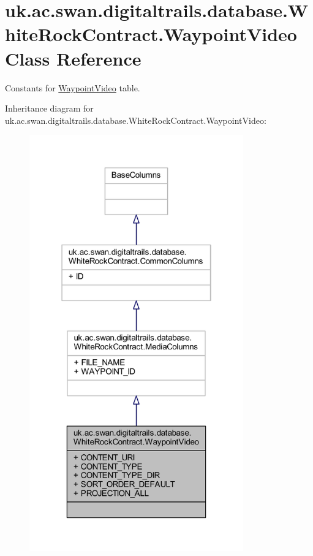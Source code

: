 \hypertarget{classuk_1_1ac_1_1swan_1_1digitaltrails_1_1database_1_1_white_rock_contract_1_1_waypoint_video}{\section{uk.\+ac.\+swan.\+digitaltrails.\+database.\+White\+Rock\+Contract.\+Waypoint\+Video Class Reference}
\label{classuk_1_1ac_1_1swan_1_1digitaltrails_1_1database_1_1_white_rock_contract_1_1_waypoint_video}
}


Constants for \hyperlink{classuk_1_1ac_1_1swan_1_1digitaltrails_1_1database_1_1_white_rock_contract_1_1_waypoint_video}{Waypoint\+Video} table.  




Inheritance diagram for uk.\+ac.\+swan.\+digitaltrails.\+database.\+White\+Rock\+Contract.\+Waypoint\+Video\+:
\nopagebreak
\begin{figure}[H]
\begin{center}
\leavevmode
\includegraphics[width=262pt]{classuk_1_1ac_1_1swan_1_1digitaltrails_1_1database_1_1_white_rock_contract_1_1_waypoint_video__inherit__graph}
\end{center}
\end{figure}


